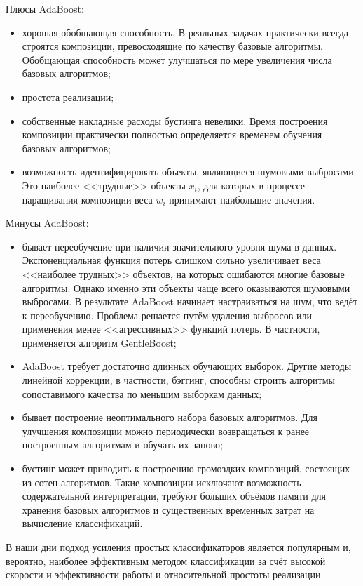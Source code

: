 Плюсы AdaBoost:
\begin{itemize}
    \item хорошая обобщающая способность. В реальных задачах практически всегда строятся композиции, превосходящие по качеству базовые
        алгоритмы. Обобщающая способность может улучшаться по мере увеличения числа базовых алгоритмов;
    \item простота реализации;
    \item собственные накладные расходы бустинга невелики. Время построения композиции практически полностью определяется временем обучения
        базовых алгоритмов;
    \item возможность идентифицировать объекты, являющиеся шумовыми выбросами. Это наиболее <<трудные>> объекты $x_i$, для которых в процессе
        наращивания композиции веса $w_i$ принимают наибольшие значения.
\end{itemize}

Минусы AdaBoost:
\begin{itemize}
    \item бывает переобучение при наличии значительного уровня шума в данных. Экспоненциальная функция потерь слишком сильно увеличивает
        веса <<наиболее трудных>> объектов, на которых ошибаются многие базовые алгоритмы. Однако именно эти объекты чаще всего оказываются
        шумовыми выбросами. В результате AdaBoost начинает настраиваться на шум, что ведёт к переобучению. Проблема решается путём
        удаления выбросов или применения менее <<агрессивных>> функций потерь. В частности, применяется алгоритм GentleBoost;
    \item AdaBoost требует достаточно длинных обучающих выборок. Другие методы линейной коррекции, в частности, бэггинг, способны строить
        алгоритмы сопоставимого качества по меньшим выборкам данных;
    \item бывает построение неоптимального набора базовых алгоритмов. Для улучшения композиции можно периодически возвращаться к ранее
        построенным алгоритмам и обучать их заново;
    \item бустинг может приводить к построению громоздких композиций, состоящих из сотен алгоритмов. Такие композиции исключают возможность
        содержательной интерпретации, требуют больших объёмов памяти для хранения базовых алгоритмов и существенных временных затрат на
        вычисление классификаций.
\end{itemize}

В наши дни подход усиления простых классификаторов является популярным и, вероятно, наиболее эффективным методом классификации за
счёт высокой скорости и эффективности работы и относительной простоты реализации.

